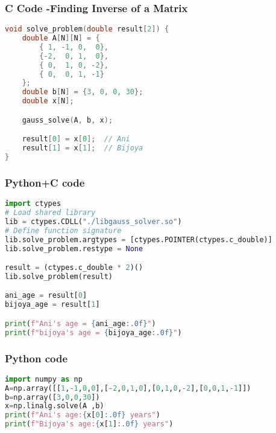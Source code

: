 \documentclass{beamer}
\begin{document}
\begin{frame}[fragile]
    \frametitle{C Code -Finding Inverse of a Matrix}

    \begin{lstlisting}[language=C]
void solve_problem(double result[2]) {
    double A[N][N] = {
        { 1, -1, 0,  0},   
        {-2,  0, 1,  0},   
        { 0,  1, 0, -2},   
        { 0,  0, 1, -1}   
    };
    double b[N] = {3, 0, 0, 30};  
    double x[N];

    gauss_solve(A, b, x);

    result[0] = x[0];  // Ani
    result[1] = x[1];  // Bijoya
}
    \end{lstlisting}
\end{frame}

\begin{frame}[fragile]
    \frametitle{Python+C code}

    \begin{lstlisting}[language=Python]
import ctypes
# Load shared library
lib = ctypes.CDLL("./libgauss_solver.so")
# Define function signature
lib.solve_problem.argtypes = [ctypes.POINTER(ctypes.c_double)]
lib.solve_problem.restype = None

result = (ctypes.c_double * 2)()
lib.solve_problem(result)

ani_age = result[0]
bijoya_age = result[1]

print(f"Ani's age = {ani_age:.0f}")
print(f"bijoya's age = {bijoya_age:.0f}")

    \end{lstlisting}
\end{frame}

\begin{frame}[fragile]
    \frametitle{Python code}
    \begin{lstlisting}[language=Python]
import numpy as np
A=np.array([[1,-1,0,0],[-2,0,1,0],[0,1,0,-2],[0,0,1,-1]])
b=np.array([3,0,0,30])
x=np.linalg.solve(A ,b)
print(f"Ani's age:{x[0]:.0f} years")
print(f"Bijoya's age:{x[1]:.0f} years") 
    \end{lstlisting}   
\end{frame}
\end{document}
